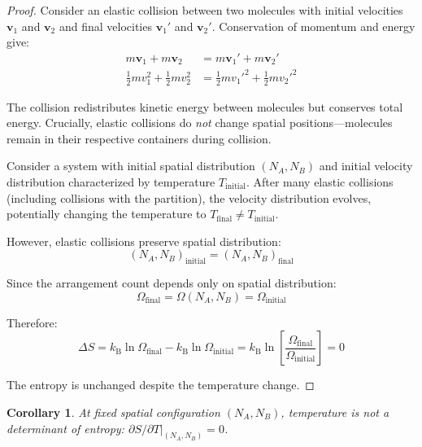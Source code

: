 \documentclass[10pt,twocolumn,letterpaper]{article}
\newtheorem{corollary}[theorem]{Corollary}
\theoremstyle{definition}
\theoremstyle{remark}
\newcommand{\kb}{k_\text{B}}
\newcommand{\Om}{\Omega}
\begin{document}
\begin{proof}
Consider an elastic collision between two molecules with initial velocities $\mathbf{v}_1$ and $\mathbf{v}_2$ and final velocities $\mathbf{v}_1'$ and $\mathbf{v}_2'$. Conservation of momentum and energy give:
\begin{align}
m\mathbf{v}_1 + m\mathbf{v}_2 &= m\mathbf{v}_1' + m\mathbf{v}_2' \label{eq:momentum_cons}\\
\frac{1}{2}m v_1^2 + \frac{1}{2}m v_2^2 &= \frac{1}{2}m v_1'^2 + \frac{1}{2}m v_2'^2 \label{eq:energy_cons}
\end{align}

The collision redistributes kinetic energy between molecules but conserves total energy. Crucially, elastic collisions do \textit{not} change spatial positions—molecules remain in their respective containers during collision.

Consider a system with initial spatial distribution $(N_A, N_B)$ and initial velocity distribution characterized by temperature $T_{\text{initial}}$. After many elastic collisions (including collisions with the partition), the velocity distribution evolves, potentially changing the temperature to $T_{\text{final}} \neq T_{\text{initial}}$.

However, elastic collisions preserve spatial distribution:
\begin{equation}
(N_A, N_B)_{\text{initial}} = (N_A, N_B)_{\text{final}}
\end{equation}

Since the arrangement count depends only on spatial distribution:
\begin{equation}
\Om_{\text{final}} = \Om(N_A, N_B) = \Om_{\text{initial}}
\end{equation}

Therefore:
\begin{equation}
\Delta S = \kb \ln \Om_{\text{final}} - \kb \ln \Om_{\text{initial}} = \kb \ln\left[\frac{\Om_{\text{final}}}{\Om_{\text{initial}}}\right] = 0
\end{equation}

The entropy is unchanged despite the temperature change.
\end{proof}

\begin{corollary}
\label{cor:temperature_entropy_indep}
At fixed spatial configuration $(N_A, N_B)$, temperature is not a determinant of entropy: $\partial S/\partial T|_{(N_A,N_B)} = 0$.
\end{corollary}
\end{document}
